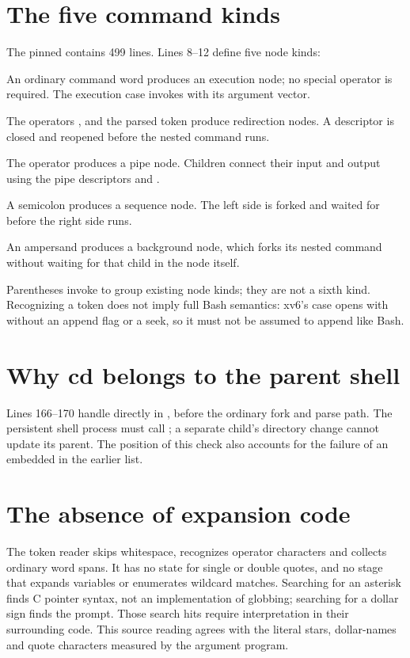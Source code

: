 \documentclass{../latex/utmreport}
\begin{document}
\section{The five command kinds}
The pinned  contains 499 lines. Lines 8--12 define five node kinds:
\begin{description}[leftmargin=1.25cm]
\item[EXEC] An ordinary command word produces an execution node; no special
operator is required. The execution case invokes  with its argument vector.
\item[REDIR] The operators \code{<}, \code{>} and the parsed \code{>>} token produce
redirection nodes. A descriptor is closed and reopened before the nested command runs.
\item[PIPE] The \code{|} operator produces a pipe node. Children connect their input
and output using the pipe descriptors and .
\item[LIST] A semicolon produces a sequence node. The left side is forked and waited
for before the right side runs.
\item[BACK] An ampersand produces a background node, which forks its nested command
without waiting for that child in the node itself.
\end{description}
Parentheses invoke  to group existing node kinds; they are not a
sixth kind. Recognizing a token does not imply full Bash semantics: xv6's \code{>>}
case opens with  without an append flag or a seek, so it
must not be assumed to append like Bash.

\section{Why cd belongs to the parent shell}
Lines 166--170 handle  directly in , before the ordinary fork
and parse path. The persistent shell process must call ; a separate
child's directory change cannot update its parent. The position of this check
also accounts for the failure of an embedded  in the earlier list.

\section{The absence of expansion code}
The token reader skips whitespace, recognizes operator characters and collects
ordinary word spans. It has no state for single or double quotes, and no stage
that expands variables or enumerates wildcard matches. Searching for an asterisk
finds C pointer syntax, not an implementation of globbing; searching for a dollar
sign finds the prompt. Those search hits require interpretation in their surrounding
code. This source reading agrees with the literal stars, dollar-names and quote
characters measured by the argument program.
\end{document}

